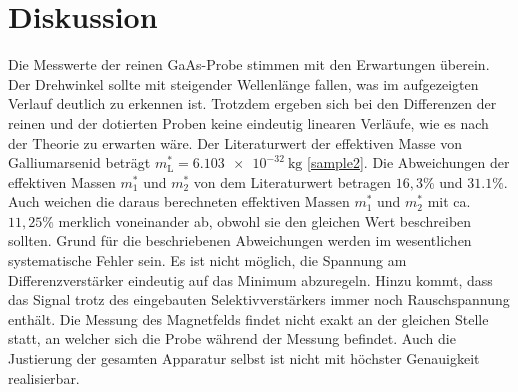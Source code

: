 \section{Diskussion}
\label{sec:Diskussion}
Die Messwerte der reinen GaAs-Probe stimmen mit den Erwartungen überein. Der
Drehwinkel sollte mit steigender Wellenlänge fallen, was im aufgezeigten Verlauf
deutlich zu erkennen ist. Trotzdem ergeben sich bei den Differenzen der reinen
und der dotierten Proben keine eindeutig linearen Verläufe, wie es nach der
Theorie zu erwarten wäre. Der Literaturwert der effektiven Masse von Galliumarsenid beträgt
$m^*_{\mathrm{L}}=\SI{6.103e-32}{\kilo\gram}$ \ref{sample2}. Die Abweichungen der effektiven Massen $m^*_1$ und $m^*_2$  von dem
Literaturwert betragen $16,3 \%$ und $31.1 \%$.
Auch weichen die daraus berechneten effektiven Massen
$m^*_1$ und $m^*_2$ mit ca. $11,25\%$ merklich voneinander ab, obwohl sie den
gleichen Wert beschreiben sollten. Grund für die beschriebenen Abweichungen werden
im wesentlichen systematische Fehler sein. Es ist nicht möglich, die Spannung am
Differenzverstärker eindeutig auf das Minimum abzuregeln. Hinzu kommt, dass das Signal
trotz des eingebauten Selektivverstärkers immer noch Rauschspannung enthält. Die
Messung des Magnetfelds findet nicht exakt an der gleichen Stelle statt, an welcher
sich die Probe während der Messung befindet. Auch die Justierung
der gesamten Apparatur selbst ist nicht mit höchster Genauigkeit realisierbar.

